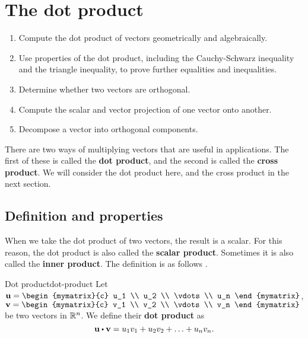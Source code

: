 \section{The dot product}
\label{sec:dot-product}

\begin{outcome}
  \begin{enumerate}
  \item Compute the dot product of vectors geometrically and
    algebraically.
  \item Use properties of the dot product, including the
    Cauchy-Schwarz inequality and the triangle inequality, to prove
    further equalities and inequalities.
  \item Determine whether two vectors are orthogonal.
  \item Compute the scalar and vector projection of one vector onto
    another.
  \item Decompose a vector into orthogonal components.
  \end{enumerate}
\end{outcome}

There are two ways of multiplying vectors that are useful in
applications. The first of these is called the \textbf{dot product},
and the second is called the \textbf{cross product}. We will consider
the dot product here, and the cross product in the next section.

\subsection{Definition and properties}

When we take the dot product of two vectors, the result is a
scalar. For this reason, the dot product is also called the
\textbf{scalar product}. Sometimes it is also called the \textbf{inner
  product}. The definition is as follows%
%
%
.

\begin{definition}{Dot product}{dot-product}
  Let $\vect{u}=\begin{mymatrix}{c}
    u_1 \\
    u_2 \\
    \vdots \\
    u_n
  \end{mymatrix}$, $\vect{v}= \begin{mymatrix}{c}
    v_1 \\
    v_2 \\
    \vdots \\
    v_n
  \end{mymatrix}$ be two vectors in $\mathbb{R}^{n}$. We
  define their \textbf{dot product} as
  \begin{equation*}
    \vect{u}\dotprod \vect{v} = u_1v_1+u_2v_2+\ldots+u_nv_n.
  \end{equation*}
\end{definition}

